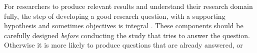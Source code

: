 For researchers to produce relevant results and understand their research domain fully, the step of developing a good research question, with a supporting hypothesis and sometimes objectives is integral \cite{Farrugia2009}. These components should be carefully designed \emph{before} conducting the study that tries to answer the question. Otherwise it is more likely to produce questions that are already answered, or  \cite[p. 280]{Farrugia2009} 
